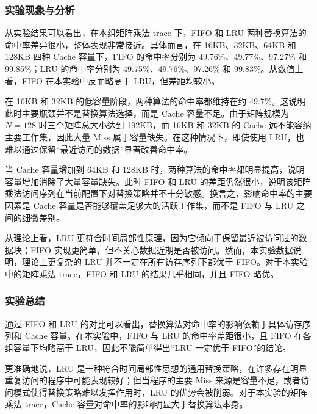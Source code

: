 \subsubsection{实验现象与分析}

从实验结果可以看出，在本组矩阵乘法 trace 下，FIFO 和 LRU 两种替换算法的命中率差异很小，整体表现非常接近。具体而言，在 16KB、32KB、64KB 和 128KB 四种 Cache 容量下，FIFO 的命中率分别为 49.76\%、49.77\%、97.27\% 和 99.85\%；LRU 的命中率分别为 49.75\%、49.76\%、97.26\% 和 99.83\%。从数值上看，FIFO 在本实验中反而略高于 LRU，但差距均较小。

在 16KB 和 32KB 的低容量阶段，两种算法的命中率都维持在约 49.7\%。这说明此时主要瓶颈并不是替换算法选择，而是 Cache 容量不足。由于矩阵规模为 $N=128$ 时三个矩阵总大小达到 192KB，而 16KB 和 32KB 的 Cache 远不能容纳主要工作集，因此大量 Miss 属于容量缺失。在这种情况下，即使使用 LRU，也难以通过保留“最近访问的数据”显著改善命中率。

当 Cache 容量增加到 64KB 和 128KB 时，两种算法的命中率都明显提高，说明容量增加消除了大量容量缺失。此时 FIFO 和 LRU 的差距仍然很小，说明该矩阵乘法访问序列在当前配置下对替换策略并不十分敏感。换言之，影响命中率的主要因素是 Cache 容量是否能够覆盖足够大的活跃工作集，而不是 FIFO 与 LRU 之间的细微差别。

从理论上看，LRU 更符合时间局部性原理，因为它倾向于保留最近被访问过的数据块；FIFO 实现更简单，但不关心数据近期是否被访问。然而，本实验数据说明，理论上更复杂的 LRU 并不一定在所有访存序列下都优于 FIFO。对于本实验中的矩阵乘法 trace，FIFO 和 LRU 的结果几乎相同，并且 FIFO 略优。

\subsubsection{实验总结}

通过 FIFO 和 LRU 的对比可以看出，替换算法对命中率的影响依赖于具体访存序列和 Cache 容量。在本实验中，FIFO 与 LRU 的命中率差距很小，且 FIFO 在各组容量下均略高于 LRU，因此不能简单得出“LRU 一定优于 FIFO”的结论。

更准确地说，LRU 是一种符合时间局部性思想的通用替换策略，在许多存在明显重复访问的程序中可能表现较好；但当程序的主要 Miss 来源是容量不足，或者访问模式使得替换策略难以发挥作用时，LRU 的优势会被削弱。对于本实验的矩阵乘法 trace，Cache 容量对命中率的影响明显大于替换算法本身。